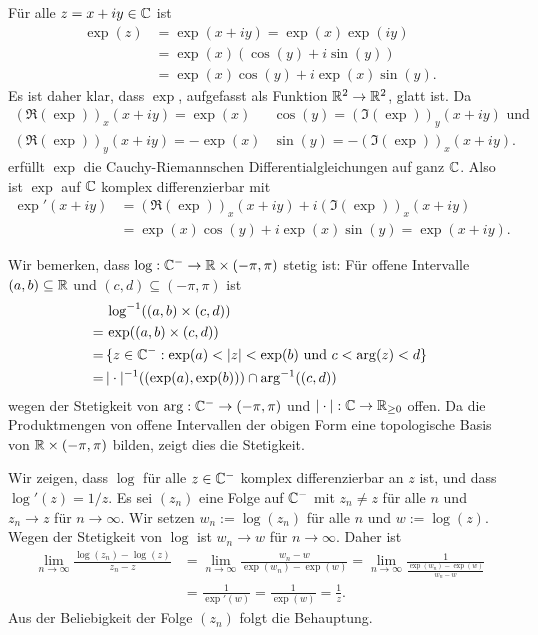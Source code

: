 \documentclass[a4paper,10pt]{article}
\begin{document}
\section{}


\subsection{}
Für alle $z = x+iy \in \mathbb{C}$ ist
\begin{align*}
 \exp(z)
 &= \exp(x+iy) = \exp(x) \exp(iy) \\
 &= \exp(x)(\cos(y) + i\sin(y)) \\
 &= \exp(x)\cos(y) + i\exp(x)\sin(y). 
\end{align*}
Es ist daher klar, dass $\exp$, aufgefasst als Funktion $\mathbb{R}^2 \to \mathbb{R}^2$, glatt ist. Da
\begin{align*}
 (\Re(\exp))_x(x+iy) = \exp(x)&\cos(y) = (\Im(\exp))_y(x+iy) \text{ und} \\
 (\Re(\exp))_y(x+iy) = -\exp(x)&\sin(y) = -(\Im(\exp))_x(x+iy).
\end{align*}
erfüllt $\exp$ die Cauchy-Riemannschen Differentialgleichungen auf ganz $\mathbb{C}$. Also ist $\exp$ auf $\mathbb{C}$ komplex differenzierbar mit
\begin{align*}
 \exp'(x+iy)
 &= (\Re(\exp))_x(x+iy) + i(\Im(\exp))_x(x+iy) \\
 &= \exp(x)\cos(y) + i\exp(x)\sin(y)
 = \exp(x+iy).
\end{align*}

Wir bemerken, dass $\log : \mathbb{C}^- \to \mathbb{R} \times (-\pi,\pi)$ stetig ist: Für offene Intervalle $(a,b) \subseteq \mathbb{R}$ und $(c,d) \subseteq (-\pi,\pi)$ ist
\begin{align*}
  &\,\log^{-1}((a,b) \times (c,d)) \\
 =&\, \exp((a,b) \times (c,d)) \\
 =&\, \{z \in \mathbb{C}^- : \exp(a) < |z| < \exp(b) \text{ und } c < \arg(z) < d \} \\
 =&\, |\cdot|^{-1}((\exp(a),\exp(b))) \cap \arg^{-1}((c,d))
\end{align*}
wegen der Stetigkeit von $\arg : \mathbb{C}^- \to (-\pi,\pi)$ und $|\cdot| : \mathbb{C} \to \mathbb{R}_{\geq 0}$ offen. Da die Produktmengen von offene Intervallen der obigen Form eine topologische Basis von $\mathbb{R} \times (-\pi,\pi)$ bilden, zeigt dies die Stetigkeit.

Wir zeigen, dass $\log$ für alle $z \in \mathbb{C}^-$ komplex differenzierbar an $z$ ist, und dass $\log'(z) = 1/z$. Es sei $(z_n)$ eine Folge auf $\mathbb{C}^-$ mit $z_n \neq z$ für alle $n$ und $z_n \to z$ für $n \to \infty$. Wir setzen $w_n := \log(z_n)$ für alle $n$ und $w := \log(z)$. Wegen der Stetigkeit von $\log$ ist $w_n \to w$ für $n \to \infty$. Daher ist
\begin{align*}
 \lim_{n \to \infty} \frac{\log(z_n) - \log(z)}{z_n -z}
 &= \lim_{n \to \infty} \frac{w_n - w}{\exp(w_n) - \exp(w)}
 = \lim_{n \to \infty} \frac{1}{\frac{\exp(w_n)-\exp(w)}{w_n-w}} \\
 &= \frac{1}{\exp'(w)}
 = \frac{1}{\exp(w)}
 = \frac{1}{z}.
\end{align*}
Aus der Beliebigkeit der Folge $(z_n)$ folgt die Behauptung.
\end{document}

